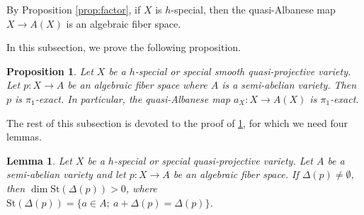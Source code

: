 \documentclass[11pt,english]{smfart}
\theoremstyle{plain}
\newtheorem{lem}[thm]{Lemma}
\newtheorem{proposition}[thm]{Proposition}
\theoremstyle{definition}
\theoremstyle{remark}
\numberwithin{equation}{subsection}
\theoremstyle{plain}
\begin{document}
 

By Proposition \ref{prop:factor}, if $X$ is $h$-special, then the quasi-Albanese map $X\to A(X)$ is an algebraic fiber space.

 In this subsection, we prove the following proposition.
 \begin{proposition}\label{pro:202210131}
Let $X$ be a $h$-special or special smooth quasi-projective variety. 
Let $p:X\to A$ be an algebraic fiber space where $A$ is a semi-abelian variety. 
Then $p$ is $\pi _1$-exact. 
In particular, the quasi-Albanese map $a_X:X\to A(X)$ is $\pi _1$-exact.
\end{proposition}





The rest of this subsection is devoted to the proof of \cref{pro:202210131}, for which we need four lemmas. 
\begin{lem}\label{lem:3}
Let $X$ be a $h$-special or special quasi-projective variety. 
Let $A$ be a semi-abelian variety and let $p:X\to A$ be an algebraic fiber space. If $\Delta (p)\not= \emptyset$, then $\dim \mathrm{St}(\Delta (p))> 0$, where $ \mathrm{St}(\Delta (p))=\{ a\in A; \ a+\Delta (p)=\Delta (p)\}$.
\end{lem}
\end{document}

